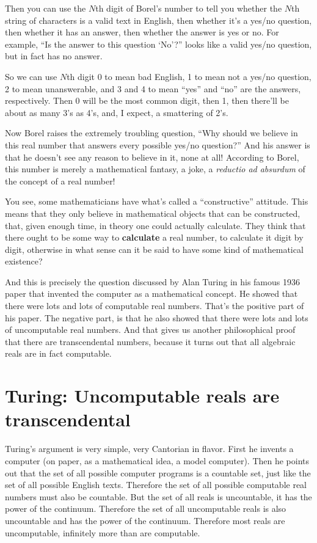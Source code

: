 \documentclass[12pt]{book}
\begin{document}
Then you can use the $N$th digit of Borel's number to tell you whether the $N$th string of characters is
a valid text in English, then whether it's a yes/no question, then whether it has an answer, 
then whether the answer is yes or no.
For example, ``Is the answer to this question `No'?'' looks like a valid yes/no question, but in
fact has no answer.
 
So we can use $N$th digit 0 to mean bad English, 1 to mean not a yes/no question,
2 to mean unanswerable, and 3 and 4 to mean ``yes'' and ``no'' are the answers, respectively.
Then 0 will be the most common digit, 
then 1, then there'll be about as many 3's as 4's, and, I expect,
a smattering of 2's.
 
Now Borel raises the extremely troubling question, ``Why should we believe in this real number
that answers every possible yes/no question?''
And his answer is that he doesn't see any reason to believe in it, none at all!
According to Borel, this number is merely a mathematical fantasy, a joke, a 
\emph{reductio ad absurdum}
of the concept of a real number!
 
You see, some mathematicians have what's called a ``constructive'' attitude. 
This means that they only believe in mathematical objects that can be constructed, that,
given enough time, in theory one could actually calculate.
They think that there ought to be some
way to \textbf{calculate} a real number, 
to calculate it digit by digit, otherwise in what sense can it be said to have some kind of
mathematical existence?
 
And this is precisely the question discussed by Alan Turing in his famous 1936 paper
that invented the computer as a mathematical concept.  
He showed that there were lots and lots of computable real numbers.
That's the positive part of his paper.
The negative part, is that he also showed that there were lots and lots of uncomputable real numbers.
And that gives us another philosophical proof that there are transcendental numbers, because
it turns out that all algebraic reals are in fact computable.

\section*{Turing: Uncomputable reals are transcendental}

Turing's argument is very simple, very Cantorian in flavor.
First he invents a computer (on paper, as a mathematical idea, a model computer).
Then he points out that the set of all possible computer programs is a countable set,
just like the set of all possible English texts.
Therefore the set of all possible computable real numbers must also be countable.
But the set of all reals is uncountable, it has the power of the continuum.
Therefore the set of all uncomputable reals is also uncountable and has the power of
the continuum.  Therefore most reals are uncomputable, infinitely more than are computable.
 
\end{document}
